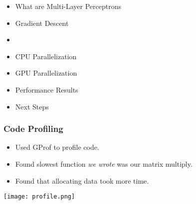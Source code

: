 \begin{frame}
\begin{itemize}
    \item What are Multi-Layer Perceptrons
    \item Gradient Descent
    \item \textbf{\color{red}{Code Profiling}}
    \item CPU Parallelization
    \item GPU Parallelization
    \item Performance Results 
    \item Next Steps
\end{itemize}
\end{frame}


\begin{frame}
    \frametitle{Code Profiling}
    \begin{itemize}
        \item Used GProf to profile code.
        \item Found slowest function \textit{we wrote} was our matrix multiply.
        \item Found that allocating data took more time. 
    \end{itemize}
    \texttt{[image: profile.png]}
\end{frame}

